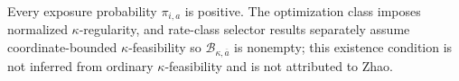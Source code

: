 Every exposure probability \(\pi_{i,a}\) is positive.  The optimization class imposes normalized \(\kappa\)-regularity, and rate-class selector results separately assume coordinate-bounded \(\kappa\)-feasibility so \(\mathcal B_{\kappa,\overline a}\) is nonempty; this existence condition is not inferred from ordinary \(\kappa\)-feasibility and is not attributed to Zhao.